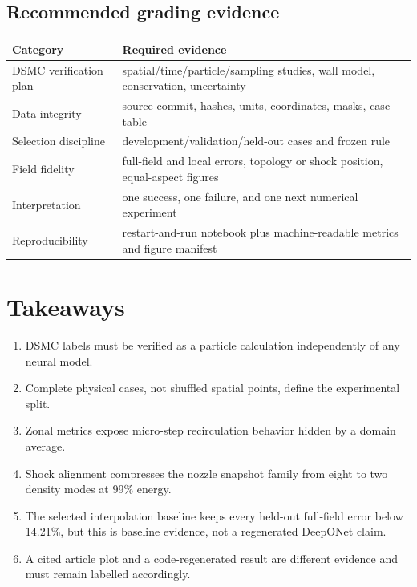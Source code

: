 \documentclass[11pt]{article}
\begin{document}
\subsection{Recommended grading evidence}
\begin{center}
\begin{tabular}{p{}p{}}
\toprule
Category & Required evidence \\
\midrule
DSMC verification plan & spatial/time/particle/sampling studies, wall model, conservation, uncertainty \\
Data integrity & source commit, hashes, units, coordinates, masks, case table \\
Selection discipline & development/validation/held-out cases and frozen rule \\
Field fidelity & full-field and local errors, topology or shock position, equal-aspect figures \\
Interpretation & one success, one failure, and one next numerical experiment \\
Reproducibility & restart-and-run notebook plus machine-readable metrics and figure manifest \\
\bottomrule
\end{tabular}
\end{center}

\clearpage
\section{Takeaways}
\begin{enumerate}
\item DSMC labels must be verified as a particle calculation independently of any neural model.
\item Complete physical cases, not shuffled spatial points, define the experimental split.
\item Zonal metrics expose micro-step recirculation behavior hidden by a domain average.
\item Shock alignment compresses the nozzle snapshot family from eight to two density modes at 99\% energy.
\item The selected interpolation baseline keeps every held-out full-field error below 14.21\%, but this is baseline evidence, not a regenerated DeepONet claim.
\item A cited article plot and a code-regenerated result are different evidence and must remain labelled accordingly.
\end{enumerate}
\end{document}

